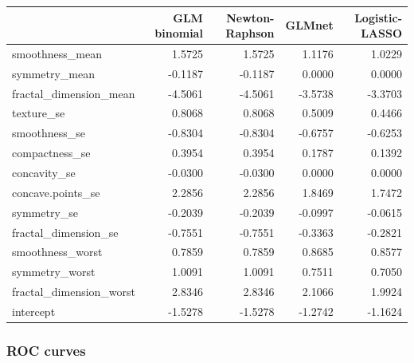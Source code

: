 \documentclass[]{article}
\newenvironment{Shaded}{\begin{snugshade}}{\end{snugshade}}
\newcommand{\KeywordTok}[1]{\textcolor[rgb]{0.13,0.29,0.53}{\textbf{#1}}}
\newcommand{\DataTypeTok}[1]{\textcolor[rgb]{0.13,0.29,0.53}{#1}}
\newcommand{\DecValTok}[1]{\textcolor[rgb]{0.00,0.00,0.81}{#1}}
\newcommand{\StringTok}[1]{\textcolor[rgb]{0.31,0.60,0.02}{#1}}
\newcommand{\OtherTok}[1]{\textcolor[rgb]{0.56,0.35,0.01}{#1}}
\newcommand{\OperatorTok}[1]{\textcolor[rgb]{0.81,0.36,0.00}{\textbf{#1}}}
\newcommand{\NormalTok}[1]{#1}
\begin{document}
\begin{Shaded}
\end{Shaded}

\begin{longtable}[]{@{}lrrrr@{}}
\toprule
& GLM binomial & Newton-Raphson & GLMnet & Logistic-LASSO\tabularnewline
\midrule
\endhead
smoothness\_mean & 1.5725 & 1.5725 & 1.1176 & 1.0229\tabularnewline
symmetry\_mean & -0.1187 & -0.1187 & 0.0000 & 0.0000\tabularnewline
fractal\_dimension\_mean & -4.5061 & -4.5061 & -3.5738 &
-3.3703\tabularnewline
texture\_se & 0.8068 & 0.8068 & 0.5009 & 0.4466\tabularnewline
smoothness\_se & -0.8304 & -0.8304 & -0.6757 & -0.6253\tabularnewline
compactness\_se & 0.3954 & 0.3954 & 0.1787 & 0.1392\tabularnewline
concavity\_se & -0.0300 & -0.0300 & 0.0000 & 0.0000\tabularnewline
concave.points\_se & 2.2856 & 2.2856 & 1.8469 & 1.7472\tabularnewline
symmetry\_se & -0.2039 & -0.2039 & -0.0997 & -0.0615\tabularnewline
fractal\_dimension\_se & -0.7551 & -0.7551 & -0.3363 &
-0.2821\tabularnewline
smoothness\_worst & 0.7859 & 0.7859 & 0.8685 & 0.8577\tabularnewline
symmetry\_worst & 1.0091 & 1.0091 & 0.7511 & 0.7050\tabularnewline
fractal\_dimension\_worst & 2.8346 & 2.8346 & 2.1066 &
1.9924\tabularnewline
intercept & -1.5278 & -1.5278 & -1.2742 & -1.1624\tabularnewline
\bottomrule
\end{longtable}

\subsubsection{ROC curves}\label{roc-curves}

\begin{Shaded}
\end{Shaded}
\end{document}
